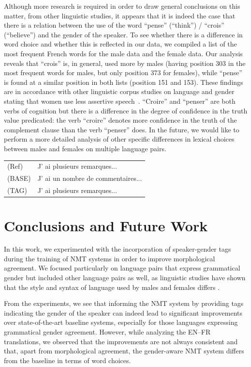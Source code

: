 Although more research is required in order to draw general conclusions on this matter, from other linguistic studies, it appears that it is indeed the case that there is a relation between the use of the word ``pense'' (``think'') / ``crois'' (``believe'') and the gender of the speaker. To see whether there is a difference in word choice and whether this is reflected in our data, we compiled a list of the most frequent French words for the male data and the female data. Our analysis reveals that ``crois'' is, in general, used more by males (having position 303 in the most frequent words for males, but only position 373 for females), while ``pense'' is found at a similar position in both lists (position 151 and 153). These findings are in accordance with other linguistic corpus studies on language and gender stating that women use less assertive speech~\cite{Newman2008}. ``Croire'' and ``penser'' are both verbs of cognition but there is a difference in the degree of confidence in the truth value predicated: the verb ``croire'' denotes more confidence in the truth of the complement clause than the verb ``penser'' does. In the future, we would like to perform a more detailed analysis of other specific differences in lexical choices between males and females on multiple language pairs.

\begin{li}
{\small \centering
\begin{tabular}{ll}
(Ref) & J' ai plusieurs remarques...\\
(BASE) & J' ai un nombre de commentaires...\\
(TAG) & J' ai plusieurs remarques...\\
\end{tabular}}\label{exmpl:wordc2}
\end{li}


\section{Conclusions and Future Work}\label{sec:conclusions}

In this work, we experimented with the incorporation of speaker-gender tags during the training of NMT systems in order to improve morphological agreement. We focused particularly on language pairs that express grammatical gender but included other language pairs as well, as linguistic studies have shown that the style and syntax of language used by males and females differs \cite{Coates2015}.

From the experiments, we see that informing the NMT system by providing tags indicating the gender of the speaker can indeed lead to significant improvements over state-of-the-art baseline systems, especially for those languages expressing grammatical gender agreement. However, while analyzing the EN--FR translations, we observed that the improvements are not always consistent and that, apart from morphological agreement, the gender-aware NMT system differs from the baseline in terms of word choices. 

